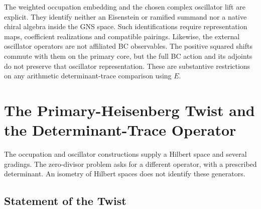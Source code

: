 \begin{remark}
\label{v4-arith:w5-b:rem:embedding-domain}
The weighted occupation embedding and the chosen complex oscillator
lift are explicit. They identify neither an Eisenstein or ramified
summand nor a native chiral algebra inside the GNS space. Such
identifications require representation maps, coefficient
realizations and compatible pairings. Likewise, the external
oscillator operators are not affiliated BC observables. The
positive squared shifts commute with them on the primary core,
but the full BC action and its adjoints do not preserve that
oscillator representation. These are substantive restrictions on
any arithmetic determinant-trace comparison using $E$.
\end{remark}
\section{The Primary-Heisenberg Twist and the Determinant-Trace Operator}
\label{v4-arith:w5-b:twist}

The occupation and oscillator constructions supply a Hilbert space
and several gradings. The zero-divisor problem asks for a different
operator, with a prescribed determinant. An isometry of Hilbert
spaces does not identify these generators.

\subsection{Statement of the Twist}
\label{v4-arith:w5-b:twist:statement}

